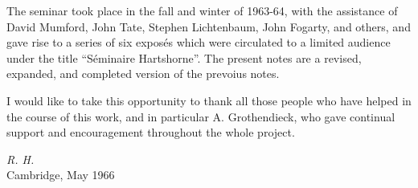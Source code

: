 The seminar took place in the fall and winter of 1963-64, with the assistance of David Mumford, John Tate, Stephen Lichtenbaum, John Fogarty, and others, and gave rise to a series of six expos\'es which were circulated to a limited audience under the title ``S\'eminaire Hartshorne''. The present notes are a revised, expanded, and completed version of the prevoius notes.\par
I would like to take this opportunity to thank all those people who have helped in the course of this work, and in particular A. Grothendieck, who gave continual support and encouragement throughout the whole project.




\vspace{\baselineskip}
\begin{flushright}\noindent
\hfill {\it R. H.}\\
Cambridge, May 1966
\end{flushright}



